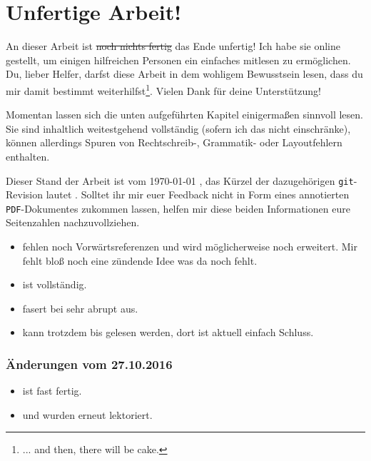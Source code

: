 \documentclass[paper=a4,fontsize=12pt,parskip=half,twoside]{scrartcl}
\title{\doctitle}
\subtitle{\docsubtitle}
\author{\docauthors}
\date{\today{}}
\begin{document}


\newpage

\section*{Unfertige Arbeit!}

An dieser Arbeit ist \sout{noch nichts fertig} das Ende unfertig! Ich habe sie online gestellt, um einigen hilfreichen Personen ein einfaches mitlesen zu ermöglichen. Du, lieber Helfer, darfst diese Arbeit in dem wohligem Bewusstsein lesen, dass du mir damit bestimmt weiterhilfst\footnote{... and then, there will be cake.}. Vielen Dank für deine Unterstützung!

Momentan lassen sich die unten aufgeführten Kapitel einigermaßen sinnvoll lesen. Sie sind inhaltlich weitestgehend vollständig (sofern ich das nicht einschränke), können allerdings Spuren von Rechtschreib-, Grammatik- oder Layoutfehlern enthalten.

Dieser Stand der Arbeit ist vom \today{} \currenttime{}, das Kürzel der dazugehörigen \texttt{git}-Revision lautet \texttt{}. Solltet ihr mir euer Feedback nicht in Form eines annotierten \texttt{PDF}-Dokumentes zukommen lassen, helfen mir diese beiden Informationen eure Seitenzahlen nachzuvollziehen.

\begin{itemize}[noitemsep]
\item {} fehlen noch Vorwärtsreferenzen und wird möglicherweise noch erweitert. Mir fehlt bloß noch eine zündende Idee was da noch fehlt.
\item {} ist vollständig.
\item {} fasert bei  sehr abrupt aus.
\item {} kann trotzdem bis  gelesen werden, dort ist aktuell einfach Schluss.
\end{itemize}

\subsubsection*{Änderungen vom 27.10.2016}
\begin{itemize}[noitemsep]
\item {} ist fast fertig.
\item {} und  wurden erneut lektoriert.
\end{itemize}
\end{document}
